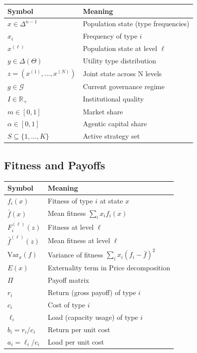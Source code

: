 \documentclass[12pt]{article}
\newcommand{\R}{\mathbb{R}}
\newcommand{\Var}{\mathrm{Var}}
\begin{document}
\begin{tabular}{ll}
\toprule
\textbf{Symbol} & \textbf{Meaning} \\
\midrule
$x \in \Delta^{n-1}$ & Population state (type frequencies) \\
$x_i$ & Frequency of type $i$ \\
$x^{(\ell)}$ & Population state at level $\ell$ \\
$y \in \Delta(\Theta)$ & Utility type distribution \\
$z = (x^{(1)}, \ldots, x^{(N)})$ & Joint state across N levels \\
$g \in \mathcal{G}$ & Current governance regime \\
$I \in \R_+$ & Institutional quality \\
$m \in [0, 1]$ & Market share \\
$\alpha \in [0, 1]$ & Agentic capital share \\
$S \subseteq \{1, \ldots, K\}$ & Active strategy set \\
\bottomrule
\end{tabular}

\subsection{Fitness and Payoffs}

\begin{tabular}{ll}
\toprule
\textbf{Symbol} & \textbf{Meaning} \\
\midrule
$f_i(x)$ & Fitness of type $i$ at state $x$ \\
$\bar{f}(x)$ & Mean fitness $\sum_i x_i f_i(x)$ \\
$F^{(\ell)}_i(z)$ & Fitness at level $\ell$ \\
$\bar{f}^{(\ell)}(z)$ & Mean fitness at level $\ell$ \\
$\Var_x(f)$ & Variance of fitness $\sum_i x_i (f_i - \bar{f})^2$ \\
$E(x)$ & Externality term in Price decomposition \\
$\Pi$ & Payoff matrix \\
$r_i$ & Return (gross payoff) of type $i$ \\
$c_i$ & Cost of type $i$ \\
$\ell_i$ & Load (capacity usage) of type $i$ \\
$b_i = r_i / c_i$ & Return per unit cost \\
$a_i = \ell_i / c_i$ & Load per unit cost \\
\bottomrule
\end{tabular}
\end{document}
